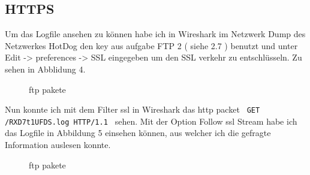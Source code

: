 \documentclass[12pt,a4paper,titlepage,oneside]{scrartcl}
\begin{document}
\subsection{HTTPS}
Um das Logfile ansehen zu können habe ich in Wireshark im Netzwerk Dump des Netzwerkes HotDog den key aus aufgabe FTP 2 ( siehe 2.7 ) benutzt und unter Edit -> preferences -> SSL eingegeben um den SSL verkehr zu entschlüsseln. Zu sehen in Abblidung 4. 

\begin{figure}[h!]
  \centering
  \caption{ftp pakete}
  \label{fig:Abilldung 4}
\end{figure}

\pagebreak

Nun konnte ich mit dem Filter ssl in Wireshark das http packet \lstinline{ GET /RXD7t1UFDS.log HTTP/1.1 } sehen. Mit der Option Follow ssl Stream habe ich das Logfile in Abbildung 5 einsehen können, aus welcher ich die gefragte Information auslesen konnte.

\begin{figure}[h!]
  \centering
  \caption{ftp pakete}
  \label{fig:Abilldung 5}
\end{figure}
\end{document}
